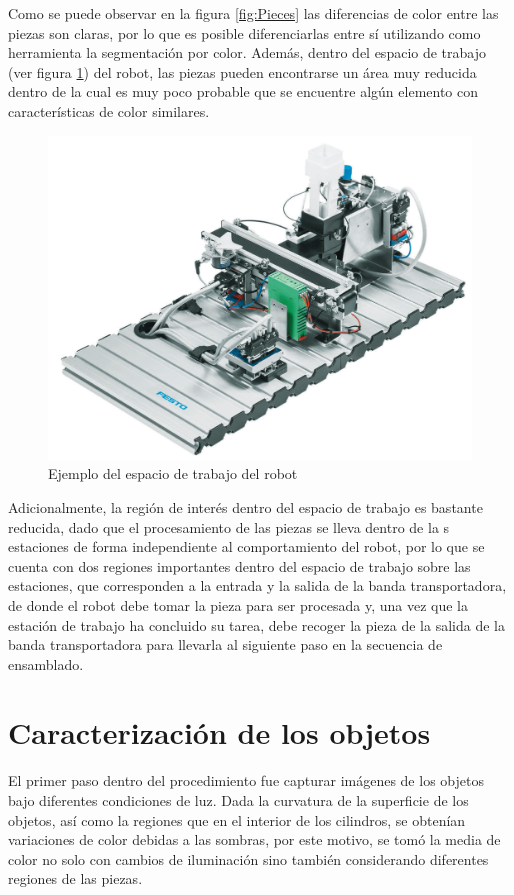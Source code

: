 Como se puede observar en la figura \ref{fig:Pieces} las diferencias de color entre las piezas son claras, por lo que es posible diferenciarlas entre sí utilizando como herramienta la segmentación por color. Además, dentro del espacio de trabajo (ver figura \ref{fig:EspaciodeTrabajo}) del robot, las piezas pueden encontrarse un área muy reducida dentro de la cual es muy poco probable que se encuentre algún elemento con características de color similares.

\begin{figure}[ht]
\centering
\includegraphics[scale= 0.2]{Figures/BandaTrans_Big.png}
    \caption{Ejemplo del espacio de trabajo del robot}
    \label{fig:EspaciodeTrabajo}
\end{figure}

Adicionalmente, la región de interés dentro del espacio de trabajo es bastante reducida, dado que el procesamiento de las piezas se lleva dentro de la s estaciones de forma independiente al comportamiento del robot, por lo que se cuenta con dos regiones importantes dentro del espacio de trabajo sobre las estaciones, que corresponden a la entrada y la salida de la banda transportadora, de donde el robot debe tomar la pieza para ser procesada y, una vez que la estación de trabajo ha concluido su tarea, debe recoger la pieza de la salida de la banda transportadora para llevarla al siguiente paso en la secuencia de ensamblado.

\section{Caracterización de los objetos}
El primer paso dentro del procedimiento fue capturar imágenes de los objetos bajo diferentes condiciones de luz. Dada la curvatura de la superficie de los objetos, así como la regiones que en el interior de los cilindros, se obtenían variaciones de color debidas a las sombras, por este motivo, se tomó la media de color no solo con cambios de iluminación sino también considerando diferentes regiones de las piezas.
\newpage

